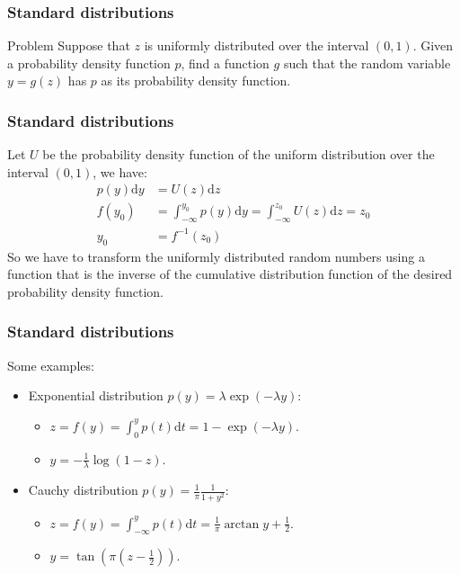 \documentclass{beamer}
\begin{document}
\begin{frame}
    \frametitle{Standard distributions}
    \begin{block}{Problem}
        Suppose that $z$ is uniformly distributed over the interval $(0,1)$. Given a probability density function $p$, find a function $g$ such that the random variable $y=g(z)$ has $p$ as its probability density function.
    \end{block}
\end{frame}

\begin{frame}
    \frametitle{Standard distributions}
    Let $U$ be the probability density function of the uniform distribution over the interval $(0,1)$, we have:
    \begin{align*}
        p(y)\mathrm{d}y&=U(z)\mathrm{d}z \\
        f(y_{0})&=\int_{-\infty}^{y_{0}}p(y)\mathrm{d}y=\int_{-\infty}^{z_{0}}U(z)\mathrm{d}z=z_{0} \\
        y_{0}&=f^{-1}(z_{0})
    \end{align*}
    So we have to transform the uniformly distributed random numbers using a function that is the inverse of the cumulative distribution function of the desired probability density function.
\end{frame}

\begin{frame}
    \frametitle{Standard distributions}
    Some examples:
    \begin{itemize}
        \item Exponential distribution $p(y)=\lambda\exp(-\lambda{}y)$:
        \begin{itemize}
            \item $z=f(y)=\int_{0}^{y}p(t)\mathrm{d}t=1-\exp(-\lambda{}y)$.
            \item $y=-\frac{1}{\lambda}\log(1-z)$.
        \end{itemize}
        \item Cauchy distribution $p(y)=\frac{1}{\pi}\frac{1}{1+y^{2}}$:
        \begin{itemize}
            \item $z=f(y)=\int_{-\infty}^{y}p(t)\mathrm{d}t=\frac{1}{\pi}\arctan{}y+\frac{1}{2}$.
            \item $y=\tan(\pi(z-\frac{1}{2}))$.
        \end{itemize}
    \end{itemize}
\end{frame}
\end{document}
